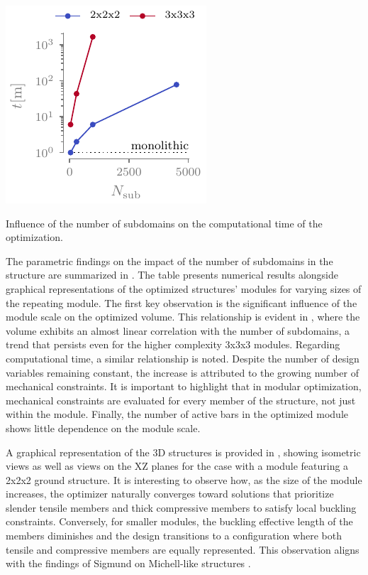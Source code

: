 \begin{marginfigure}
    \centering
    \includegraphics{figures/05_cellular_opt/00_module_scale_tab/scale_tab_t.pdf}
    \caption{Influence of the number of subdomains on the computational time of the optimization.}
    \label{fig:05_scale_t}
\end{marginfigure}

The parametric findings on the impact of the number of subdomains in the structure are summarized in . The table presents numerical results alongside graphical representations of the optimized structures' modules for varying sizes of the repeating module. The first key observation is the significant influence of the module scale on the optimized volume. This relationship is evident in , where the volume exhibits an almost linear correlation with the number of subdomains, a trend that persists even for the higher complexity 3x3x3 modules. Regarding computational time, a similar relationship is noted. Despite the number of design variables remaining constant, the increase is attributed to the growing number of mechanical constraints. It is important to highlight that in modular optimization, mechanical constraints are evaluated for every member of the structure, not just within the module. Finally, the number of active bars in the optimized module shows little dependence on the module scale.

A graphical representation of the 3D structures is provided in , showing isometric views as well as views on the XZ planes for the case with a module featuring a 2x2x2 ground structure. It is interesting to observe how, as the size of the module increases, the optimizer naturally converges toward solutions that prioritize slender tensile members and thick compressive members to satisfy local buckling constraints.
Conversely, for smaller modules, the buckling effective length of the members diminishes and the design transitions to a configuration where both tensile and compressive members are equally represented. This observation aligns with the findings of Sigmund on Michell-like structures .

